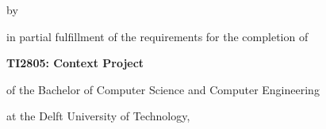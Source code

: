 \begin{titlepage}

\begin{center}


\vspace*{2\bigskipamount}

{\makeatletter
\titlestyle\color{tudelft-cyan}\Huge\@title
\makeatother}

{\makeatletter
\ifx\@subtitle\undefined\else
    \bigskip
    \titlefont\titleshape\LARGE\@subtitle
\fi
\makeatother}

\bigskip
\bigskip

by

\bigskip
\bigskip

{\makeatletter
\titlefont\Large\bfseries\@author
\makeatother}

\vfill

in partial fulfillment of the requirements for the completion of

\bigskip
\bigskip

{\bfseries TI2805: Context Project}

of the Bachelor of Computer Science and Computer Engineering

\bigskip
\bigskip

at the Delft University of Technology,

\vfill


\end{center}
\end{titlepage}
